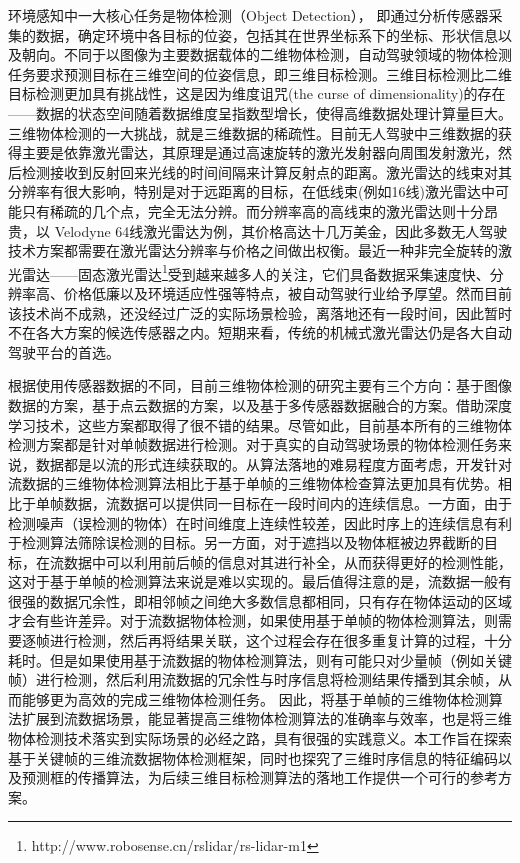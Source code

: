 环境感知中一大核心任务是物体检测（Object Detection）， 即通过分析传感器采集的数据，确定环境中各目标的位姿，包括其在世界坐标系下的坐标、形状信息以及朝向。不同于以图像为主要数据载体的二维物体检测，自动驾驶领域的物体检测任务要求预测目标在三维空间的位姿信息，即三维目标检测。三维目标检测比二维目标检测更加具有挑战性，这是因为维度诅咒(the curse of dimensionality)的存在——数据的状态空间随着数据维度呈指数型增长，使得高维数据处理计算量巨大。 三维物体检测的一大挑战，就是三维数据的稀疏性。目前无人驾驶中三维数据的获得主要是依靠激光雷达，其原理是通过高速旋转的激光发射器向周围发射激光，然后检测接收到反射回来光线的时间间隔来计算反射点的距离。激光雷达的线束对其分辨率有很大影响，特别是对于远距离的目标，在低线束(例如16线)激光雷达中可能只有稀疏的几个点，完全无法分辨。而分辨率高的高线束的激光雷达则十分昂贵，以 Velodyne 64线激光雷达为例，其价格高达十几万美金，因此多数无人驾驶技术方案都需要在激光雷达分辨率与价格之间做出权衡。最近一种非完全旋转的激光雷达——固态激光雷达\footnote[3]{http://www.robosense.cn/rslidar/rs-lidar-m1}受到越来越多人的关注，它们具备数据采集速度快、分辨率高、价格低廉以及环境适应性强等特点，被自动驾驶行业给予厚望。然而目前该技术尚不成熟，还没经过广泛的实际场景检验，离落地还有一段时间，因此暂时不在各大方案的候选传感器之内。短期来看，传统的机械式激光雷达仍是各大自动驾驶平台的首选。



根据使用传感器数据的不同，目前三维物体检测的研究主要有三个方向：基于图像数据的方案\cite{7780605, chen20183d}，基于点云数据的方案\cite{li20173d,engelcke2017vote3deep,zhou2018voxelnet,simon2018complex,shi2019pointrcnn}，以及基于多传感器数据融合的方案\cite{qi2018frustum,chen2017multi,ku2018joint}。借助深度学习技术，这些方案都取得了很不错的结果。尽管如此，目前基本所有的三维物体检测方案都是针对单帧数据进行检测。对于真实的自动驾驶场景的物体检测任务来说，数据都是以流的形式连续获取的。从算法落地的难易程度方面考虑，开发针对流数据的三维物体检测算法相比于基于单帧的三维物体检查算法更加具有优势。相比于单帧数据，流数据可以提供同一目标在一段时间内的连续信息。一方面，由于检测噪声（误检测的物体）在时间维度上连续性较差，因此时序上的连续信息有利于检测算法筛除误检测的目标。另一方面，对于遮挡以及物体框被边界截断的目标，在流数据中可以利用前后帧的信息对其进行补全，从而获得更好的检测性能，这对于基于单帧的检测算法来说是难以实现的。最后值得注意的是，流数据一般有很强的数据冗余性，即相邻帧之间绝大多数信息都相同，只有存在物体运动的区域才会有些许差异。对于流数据物体检测，如果使用基于单帧的物体检测算法，则需要逐帧进行检测，然后再将结果关联，这个过程会存在很多重复计算的过程，十分耗时。但是如果使用基于流数据的物体检测算法，则有可能只对少量帧（例如关键帧）进行检测，然后利用流数据的冗余性与时序信息将检测结果传播到其余帧，从而能够更为高效的完成三维物体检测任务。 因此，将基于单帧的三维物体检测算法扩展到流数据场景，能显著提高三维物体检测算法的准确率与效率，也是将三维物体检测技术落实到实际场景的必经之路，具有很强的实践意义。本工作旨在探索基于关键帧的三维流数据物体检测框架，同时也探究了三维时序信息的特征编码以及预测框的传播算法，为后续三维目标检测算法的落地工作提供一个可行的参考方案。

